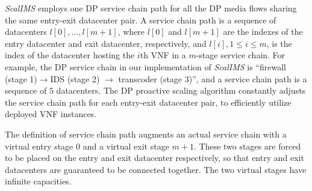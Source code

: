 \textit{ScalIMS} employs one DP service chain path for all the DP media flows sharing the same entry-exit datacenter pair. A service chain path is a sequence of datacenters $l[0],\ldots,l[m+1]$, where $l[0]$ and $l[m+1]$ are the indexes of the entry datacenter and exit datacenter, respectively, and $l[i], 1\le i\le m$, is the index of the datacenter hosting the $i$th VNF in a $m$-stage service chain.
For example, the DP service chain in our implementation of \textit{ScalIMS} is ``firewall (stage 1)$\rightarrow$IDS (stage 2) $\rightarrow$ transcoder (stage 3)'', and a service chain path is a sequence of $5$ datacenters. The DP proactive scaling algorithm constantly adjusts the service chain path for each entry-exit datacenter pair, to efficiently utilize deployed VNF instances.

The definition of service chain path augments an actual service chain with a virtual entry stage $0$ and a virtual exit stage $m+1$. These two stages are forced to be placed on the entry and exit datacenter respectively, so that entry and exit datacenters are guaranteed to be connected together. The two virtual stages have infinite capacities.






